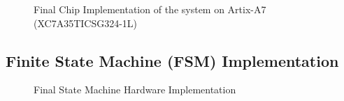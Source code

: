 \documentclass[a4paper]{report}
\begin{document}
\begin{figure}[H]
  \caption{Final Chip Implementation of the system on Artix-A7 (XC7A35TICSG324-1L)}
  \label{fig:on-chip-impl}
\end{figure}

\subsection{Finite State Machine (FSM) Implementation}

\begin{figure}[h!]
  \caption{Final State Machine Hardware Implementation}
  \label{fig:fsm-impl}
\end{figure}
\end{document}
